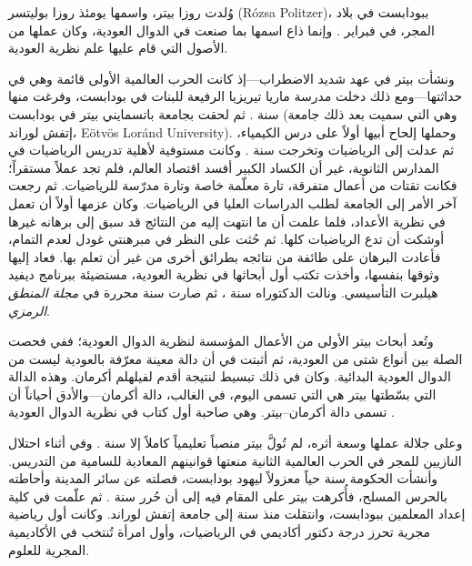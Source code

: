 \documentclass[../../../include/open-logic-section]{subfiles}
\begin{document}



وُلدت روزا بيتر، واسمها يومئذ روزا بوليتسر (R\'ozsa Politzer)، ببودابست
في بلاد المجر، في  فبراير . وإنما ذاع اسمها بما صنعت في الدوال
العودية، وكان عملها من الأصول التي قام عليها علم نظرية العودية.

ونشأت بيتر في عهد شديد الاضطراب---إذ كانت الحرب العالمية الأولى قائمة
وهي في حداثتها---ومع ذلك دخلت مدرسة ماريا تيريزيا الرفيعة للبنات في
بودابست، وفرغت منها سنة . ثم لحقت بجامعة باتسمايني بيتر في بودابست
(وهي التي سميت بعد ذلك جامعة إتفش لوراند، E\"otv\"os Lor\'and
University). وحملها إلحاح أبيها أولاً على درس الكيمياء، ثم عدلت إلى
الرياضيات وتخرجت سنة . وكانت مستوفية لأهلية تدريس الرياضيات في
المدارس الثانوية، غير أن الكساد الكبير أفسد اقتصاد العالم، فلم تجد عملاً
مستقراً؛ فكانت تقتات من أعمال متفرقة، تارة معلّمة خاصة وتارة مدرّسة
للرياضيات. ثم رجعت آخر الأمر إلى الجامعة لطلب الدراسات العليا في
الرياضيات. وكان عزمها أولاً أن تعمل في نظرية الأعداد، فلما علمت أن ما
انتهت إليه من النتائج قد سبق إلى برهانه غيرها أوشكت أن تدع الرياضيات
كلها. ثم حُثت على النظر في مبرهنتي غودل لعدم التمام، فأعادت البرهان على
طائفة من نتائجه بطرائق أخرى من غير أن تعلم بها. فعاد إليها وثوقها بنفسها،
وأخذت تكتب أول أبحاثها في نظرية العودية، مستضيئة ببرنامج ديفيد هيلبرت
التأسيسي. ونالت الدكتوراه سنة ، ثم صارت سنة  محررة في \emph{مجلة
المنطق الرمزي}.

وتُعد أبحاث بيتر الأولى من الأعمال المؤسسة لنظرية الدوال العودية؛ ففي
\cite{Peter1935a} فحصت الصلة بين أنواع شتى من العودية، ثم أثبتت في
\cite{Peter1935b} أن دالة معينة معرّفة بالعودية ليست من الدوال
العودية البدائية. وكان في ذلك تبسيط لنتيجة أقدم لفيلهلم أكرمان. وهذه
الدالة التي بسّطتها بيتر هي التي تسمى اليوم، في الغالب، دالة
أكرمان---والأدق أحياناً أن تسمى دالة أكرمان--بيتر. وهي صاحبة أول كتاب في
نظرية الدوال العودية \citep{Peter1951}.

وعلى جلالة عملها وسعة أثره، لم تُولَّ بيتر منصباً تعليمياً كاملاً إلا سنة
. وفي أثناء احتلال النازيين للمجر في الحرب العالمية الثانية منعتها
قوانينهم المعادية للسامية من التدريس. وأنشأت الحكومة سنة  حياً معزولاً
ليهود بودابست، فصلته عن سائر المدينة وأحاطته بالحرس المسلح، فأُكرهت بيتر
على المقام فيه إلى أن حُرر سنة . ثم علّمت في كلية إعداد المعلمين
ببودابست، وانتقلت منذ سنة  إلى جامعة إتفش لوراند. وكانت أول رياضية
مجرية تحرز درجة دكتور أكاديمي في الرياضيات، وأول امرأة تُنتخب في
الأكاديمية المجرية للعلوم.
\end{document}
